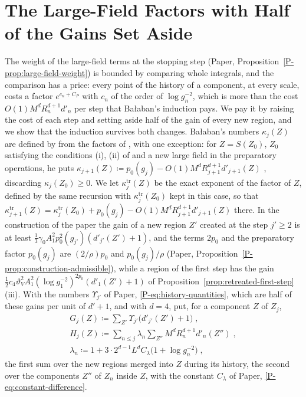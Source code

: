 \documentclass[11pt]{preprint}
\numberwithin{equation}{section}
\theoremstyle{definition}
\theoremstyle{remark}
\theoremstyle{plain}
\begin{document}
\section{The Large-Field Factors with Half of the Gains Set Aside}\label{sec:half-gains}

The weight of the large-field terms at the stopping step (Paper, Proposition~\ref{P-prop:large-field-weight}) is bounded by comparing whole integrals, and the comparison has a price: every point of the history of a component, at every scale, costs a factor $e^{c_n + C_P}$ with $c_n$ of the order of $\log g_n^{-2}$, which is more than the cost $O(1)M^dR_n^{d+1}d'_n$ per step that Ba{\l}aban's induction \cite[(1.80)--(1.88), pp.~384--387]{BalabanLFR2} pays. We pay it by raising the cost of each step and setting aside half of the gain of every new region, and we show that the induction survives both changes. Ba{\l}aban's numbers $\kappa_j(Z)$ are defined by \cite[(1.83), (1.85)]{BalabanLFR2} from the factors of \cite[(1.79), p.~383]{BalabanLFR2}, with one exception: for $Z = S(Z_0)$, $Z_0$ satisfying the conditions (i), (ii) of \cite[p.~177]{BalabanLFR1} and a new large field in the preparatory operations, he puts $\kappa_{j+1}(Z) \coloneqq p_0(g_j) - O(1)M^dR_{j+1}^{d+1}d'_{j+1}(Z)$ \cite[p.~386]{BalabanLFR2}, discarding $\kappa_j(Z_0) \geq 0$. We let $\kappa^{\mathrm{tr}}_j(Z)$ be the exact exponent of the factor of $Z$, defined by the same recursion with $\kappa^{\mathrm{tr}}_j(Z_0)$ kept in this case, so that $\kappa^{\mathrm{tr}}_{j+1}(Z) = \kappa^{\mathrm{tr}}_j(Z_0) + p_0(g_j) - O(1)M^dR_{j+1}^{d+1}d'_{j+1}(Z)$ there. In the construction of the paper the gain of a new region $Z'$ created at the step $j' \geq 2$ is at least $\frac13\gamma_0A_1^2p_0^2(g_{j'})(d'_{j'}(Z') + 1)$, and the terms $2p_0$ and the preparatory factor $p_0(g_j)$ are $(2/\rho)p_0$ and $p_0(g_j)/\rho$ (Paper, Proposition~\ref{P-prop:construction-admissible}), while a region of the first step has the gain $\frac12c_4\vartheta_V^2A_1^2(\log g_1^{-2})^{2p_0}(d'_1(Z') + 1)$ of Proposition~\ref{prop:retreated-first-step}(iii). With the numbers $\Upsilon_{j'}$ of Paper, \eqref{P-eq:history-quantities}, which are half of these gains per unit of $d' + 1$, and with $d = 4$, put, for a component $Z$ of $Z_j$,
\begin{equation}\label{eq:gain-cost-split}
    \begin{gathered}
        G_j(Z) \coloneqq \sum_{Z'}\Upsilon_{j'}\bigl(d'_{j'}(Z') + 1\bigr)\;,
        \\
        H_j(Z) \coloneqq \sum_{n \leq j}\lambda_n\sum_{Z''}M^dR_n^{d+1}d'_n(Z'')\;,
        \\
        \lambda_n \coloneqq 1 + 3 \cdot 2^{d-1}L^dC_\lambda\bigl(1 + \log g_n^{-2}\bigr)\;,
    \end{gathered}
\end{equation}
the first sum over the new regions merged into $Z$ during its history, the second over the components $Z''$ of $Z_n$ inside $Z$, with the constant $C_\lambda$ of Paper, \eqref{P-eq:constant-difference}.
\end{document}
